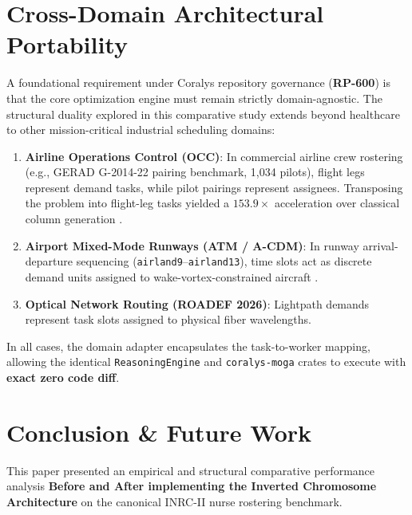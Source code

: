 \documentclass[10pt,journal,compsoc]{IEEEtran}
\begin{document}
\section{Cross-Domain Architectural Portability}
\label{sec:cross_domain}

A foundational requirement under Coralys repository governance (\textbf{RP-600}) is that the core optimization engine must remain strictly domain-agnostic. The structural duality explored in this comparative study extends beyond healthcare to other mission-critical industrial scheduling domains:
\begin{enumerate}
    \item \textbf{Airline Operations Control (OCC)}: In commercial airline crew rostering (e.g., GERAD G-2014-22 pairing benchmark, 1,034 pilots), flight legs represent demand tasks, while pilot pairings represent assignees. Transposing the problem into flight-leg tasks yielded a $153.9\times$ acceleration over classical column generation \cite{desaulniers1998crew}.
    \item \textbf{Airport Mixed-Mode Runways (ATM / A-CDM)}: In runway arrival-departure sequencing (\texttt{airland9}--\texttt{airland13}), time slots act as discrete demand units assigned to wake-vortex-constrained aircraft \cite{anbil1991crew}.
    \item \textbf{Optical Network Routing (ROADEF 2026)}: Lightpath demands represent task slots assigned to physical fiber wavelengths.
\end{enumerate}

In all cases, the domain adapter encapsulates the task-to-worker mapping, allowing the identical \texttt{ReasoningEngine} and \texttt{coralys-moga} crates to execute with \textbf{exact zero code diff}.

\section{Conclusion \& Future Work}
\label{sec:conclusion}

This paper presented an empirical and structural comparative performance analysis \textbf{Before and After implementing the Inverted Chromosome Architecture} on the canonical INRC-II nurse rostering benchmark.
\end{document}
